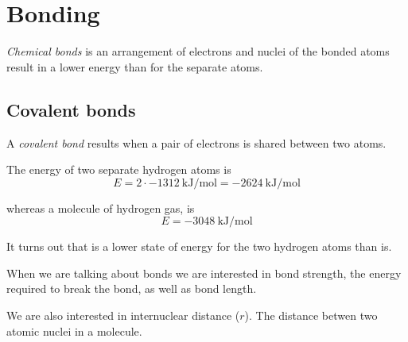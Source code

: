 \documentclass[../mit-general-chemistry.tex]{subfiles}
\begin{document}
\chapter{Bonding}



{\em Chemical bonds} is an arrangement of electrons and nuclei of the
bonded atoms result in a lower energy than for the separate atoms.

\section{Covalent bonds}

A {\em covalent bond} results when a pair of electrons is shared
between two atoms.


\begin{example}
  The energy of two separate hydrogen atoms is
  \begin{equation*}
    E = 2 \cdot -1312~\si{\kilo\joule\per\mol} = -2624~\si{\kilo\joule\per\mol}
  \end{equation*}

  whereas a molecule of hydrogen gas,  is
  \begin{equation*}
    E = -3048~\si{\kilo\joule\per\mol}
  \end{equation*}

  It turns out that  is a lower state of energy for the two
  hydrogen atoms than  is.
\end{example}



When we are talking about bonds we are interested in bond strength,
the energy required to break the bond, as well as bond length.

We are also interested in internuclear distance ($r$). The distance
betwen two atomic nuclei in a molecule.
\end{document}
